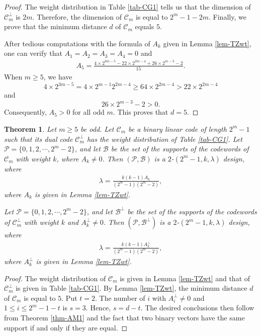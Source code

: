 \documentclass[1p,final]{elsarticle}
\newtheorem{theorem}{Theorem}
\newcommand{\cP}{{\mathcal{P}}}
\newcommand{\cB}{{\mathcal{B}}}
\newcommand{\C}{{\mathcal{C}}}
\begin{document}
\begin{proof}
The weight distribution in Table \ref{tab-CG1} tells us that the dimension of $\C_m^\perp$ 
is $2m$. Therefore, the dimension of $\C_m$ is equal to $2^m-1-2m$. Finally, we 
prove that the minimum distance $d$ of $\C_m$ equals $5$. 

After tedious computations with the formula of $A_k$ given in Lemma \ref{lem-TZwt}, 
one can verify that $A_1=A_2=A_3=A_4=0$ and  
\begin{eqnarray}\label{eqn-minimumwt5}
A_5=\frac{4\times 2^{3m-5} - 22 \times 2^{2m-4} + 26 \times 2^{m-3} -2}{15}. 
\end{eqnarray} 
When $m \geq 5$, we have  
$$
4\times 2^{3m-5} = 4 \times 2^{m-1} 2^{2m-4} \geq 64 \times 2^{2m-4} > 22 \times 2^{2m-4}
$$ 
and 
$$ 
26 \times 2^{m-3} -2 >0. 
$$
Consequently, $A_5>0$ for all odd $m$. This proves that $d=5$.  



\end{proof}



\begin{theorem}\label{thm-newdesigns1} 
Let $m \geq 5$ be odd. 
Let $\C_m$ be a binary linear code of length $2^m-1$ such that its dual code
$\C_m^\perp$ has the weight distribution of Table \ref{tab-CG1}. 
Let $\cP=\{0,1,2, \cdots, 2^m-2\}$, and let $\cB$ be  the set of the supports of the codewords of $\C_m$
with weight $k$, where $A_k \neq 0$. Then $(\cP, \cB)$
is a $2$-$(2^m-1, k, \lambda)$ design, where
\begin{eqnarray*}
\lambda=\frac{k(k-1)A_k}{(2^m-1)(2^m-2)}, 
\end{eqnarray*} 
where $A_k$ is given in Lemma \ref{lem-TZwt}. 

Let $\cP=\{0,1,2, \cdots, 2^m-2\}$, and let $\cB^\perp$ be  the set of  the supports of the codewords of $\C_m^\perp$
with weight $k$ and $A_k^\perp \neq 0$. Then $(\cP, \cB^\perp)$
is a $2$-$(2^m-1, k, \lambda)$ design, where
\begin{eqnarray*}
\lambda=\frac{k(k-1)A_k^\perp}{(2^m-1)(2^m-2)}, 
\end{eqnarray*}
where $A_k^\perp$ is given in Lemma \ref{lem-TZwt}. 
\end{theorem}


\begin{proof}
The weight distribution of $\C_m$ is given in Lemma \ref{lem-TZwt} and that of $\C_m^\perp$ 
is given in Table \ref{tab-CG1}. By Lemma \ref{lem-TZwt}, the minimum distance $d$ of $\C_m$ 
is equal to $5$. Put $t=2$. The number of $i$ with $A_i^\perp \neq 0$ and $1 \leq i \leq 2^m-1 -t$ 
is $s=3$. Hence, $s=d-t$. The desired conclusions then follow from Theorem \ref{thm-AM1} and 
the fact that two binary vectors have the same support if and only if they are equal.  
\end{proof}
\end{document}
